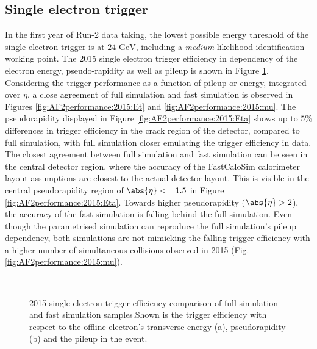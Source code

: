 \subsection{Single electron trigger}
In the first year of Run-2 data taking,  the lowest possible energy threshold of the single electron trigger is at $24 \text{ GeV}$,  including a \textit{medium} likelihood identification working point.  The 2015 single electron trigger efficiency in dependency of the electron energy,  pseudo-rapidity as well as pileup is shown in Figure \ref{fig:AF2performance:2015}.  \\
Considering the trigger performance as a function of pileup or energy,  integrated over $\eta$,  a close agreement of full simulation and fast simulation is observed in Figures \ref{fig:AF2performance:2015:Et} and \ref{fig:AF2performance:2015:mu}.  The pseudorapidity displayed in Figure \ref{fig:AF2performance:2015:Eta} shows up to $5\% $ differences in trigger efficiency in the crack region of the detector, compared to full simulation,  with full simulation closer emulating the trigger efficiency in data.  The closest agreement between full simulation and fast simulation can be seen in the central detector region,  where the accuracy of the FastCaloSim calorimeter layout assumptions are closest to the actual detector layout.  This is visible in the central pseudorapidity region of $\abs{\eta} <= 1.5$ in Figure \ref{fig:AF2performance:2015:Eta}.
Towards higher pseudorapidity ($\abs{\eta} >2$), the accuracy of the fast simulation is falling behind the full simulation. 
Even though the parametrised simulation can reproduce the full simulation's pileup dependency,  both simulations are not mimicking the falling trigger efficiency with a higher number of simultaneous collisions observed in 2015 (Fig.  \ref{fig:AF2performance:2015:mu}). 

\begin{figure}[h!]\centering
  \\
  \caption{2015 single electron trigger efficiency comparison of full simulation and fast simulation samples.Shown is the trigger efficiency with respect to the offline electron's transverse energy (a),  pseudorapidity (b) and the pileup in the event.}
  \label{fig:AF2performance:2015}
\end{figure}

